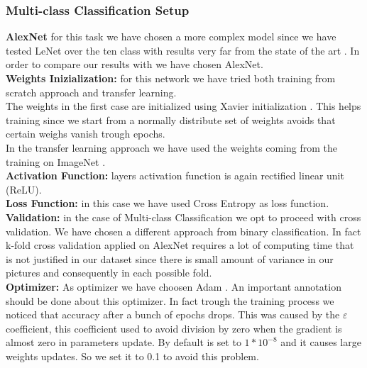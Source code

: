 \subsubsection{Multi-class Classification Setup}
\textbf{AlexNet}
for this task we have chosen a more complex model since we have tested LeNet over the ten class with results very far from the state of the art \cite{ref11}. In order to compare our results with \cite{ref11} we have chosen AlexNet.  \\
\textbf{Weights Inizialization:}
for this network we have tried both training from scratch approach and transfer learning. \\\indent The weights in the first case are initialized using Xavier initialization \cite{ref31}. This helps training  since we start from a normally distribute set of weights avoids that certain weighs vanish trough epochs.\\\indent In the transfer learning approach we have used the weights coming from the training on ImageNet \cite{imagenet}.
\\
\textbf{Activation Function:}
layers activation function is again rectified linear unit (ReLU).
\\
\textbf{Loss Function:}
in this case we have used Cross Entropy as loss function.
\\
\textbf{Validation:}
in the case of Multi-class Classification we opt to proceed with cross validation. We have chosen a different approach from binary classification. In fact k-fold cross validation applied on AlexNet requires a lot of computing time that is not justified in our dataset since there is small amount of variance in our pictures and consequently in each possible fold.
\\
\textbf{Optimizer:}
As optimizer we have choosen Adam \cite{ref32}. An important annotation should be done about this optimizer. In fact trough the training process we noticed that accuracy after a bunch of epochs drops. This was caused by the $\varepsilon$ coefficient, this coefficient used to avoid division by zero when the gradient is almost zero in parameters update.  By default is set to $1*10^{-8}$ and it causes large weights updates. So we set it to 0.1 to avoid this problem.

